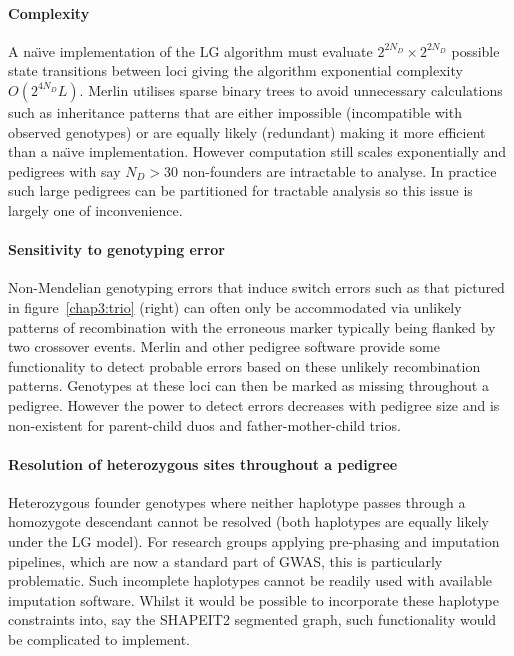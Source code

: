 \paragraph{Complexity}
A na\"{\i}ve implementation of the LG algorithm must evaluate $2^{2N_D} \times 2^{2N_D}$ possible state transitions between loci giving the algorithm exponential complexity $O(2^{4N_D}L)$. Merlin utilises sparse binary trees to avoid unnecessary calculations such as inheritance patterns that are either impossible (incompatible with observed genotypes) or are equally likely (redundant) making it more efficient than a na\"{\i}ve implementation.  However computation still scales exponentially and pedigrees with say $N_D>30$ non-founders are intractable to analyse.  In practice such large pedigrees can be partitioned for tractable analysis so this issue is largely one of inconvenience.

\paragraph{Sensitivity to genotyping error}
Non-Mendelian genotyping errors that induce switch errors such as that pictured in figure~\ref{chap3:trio} (right) can often only be accommodated via unlikely patterns of recombination with the erroneous marker typically being flanked by two crossover events.   Merlin and other pedigree software provide some functionality to detect probable errors based on these unlikely recombination patterns.  Genotypes at these loci can then be marked as missing throughout a pedigree. However the power to detect errors decreases with pedigree size and is non-existent for parent-child duos and father-mother-child trios.

\paragraph{Resolution of heterozygous sites throughout a pedigree}
Heterozygous founder genotypes where neither haplotype passes through a homozygote descendant cannot be resolved (both haplotypes are equally likely under the LG model).  For research groups applying pre-phasing and imputation pipelines, which are now a standard part of GWAS, this is particularly problematic.  Such incomplete haplotypes cannot be readily used with available imputation software.  Whilst it would be possible to incorporate these haplotype constraints into, say the SHAPEIT2 segmented graph, such functionality would be complicated to implement.

